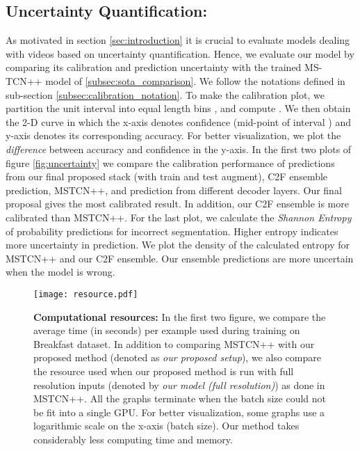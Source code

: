 \documentclass[10pt,twocolumn,letterpaper]{article}
\begin{document}
\subsection{Uncertainty Quantification:}\label{subsec:uncertainty_quantification}

As motivated in section \ref{sec:introduction} it is crucial to evaluate models dealing with videos based on uncertainty quantification.
Hence, we evaluate our model by comparing its calibration and prediction uncertainty with the trained MS-TCN++ model of \ref{subsec:sota_comparison}. We follow the notations defined in sub-section \ref{subsec:calibration_notation}. To make the calibration plot, we partition the unit interval  into  equal length bins , and compute . We then obtain the 2-D curve  in which the x-axis denotes confidence (mid-point of interval ) and y-axis denotes its corresponding accuracy. For better visualization, we plot the \textit{difference} between accuracy and confidence in the y-axis. In the first two plots of figure \ref{fig:uncertainty} we compare the calibration performance of predictions from our final proposed stack (with train and test augment), C2F ensemble prediction, MSTCN++, and prediction from different decoder layers. Our final proposal gives the most calibrated result. In addition, our C2F ensemble is more calibrated than MSTCN++. For the last plot, we calculate the \textit{Shannon Entropy} of probability predictions for incorrect segmentation. Higher entropy indicates more uncertainty in prediction. We plot the density of the calculated entropy for MSTCN++ and our C2F ensemble. Our ensemble predictions are more uncertain when the model is wrong.


\begin{figure*}[ht!]
\centering
\texttt{[image: resource.pdf]}
\caption{\textbf{Computational resources:} In the first two figure, we compare the average time (in seconds) per example used during training on Breakfast dataset. In addition to comparing MSTCN++ with our proposed method (denoted as \textit{our proposed setup}), we also compare the resource used when our proposed method is run with full resolution inputs (denoted by \textit{our model (full resolution)}) as done in MSTCN++. All the graphs terminate when the batch size could not be fit into a single GPU. For better visualization, some graphs use a logarithmic scale on the x-axis (batch size). Our method takes considerably less computing time and memory.}
\label{fig:resources}
\end{figure*}
\end{document}
